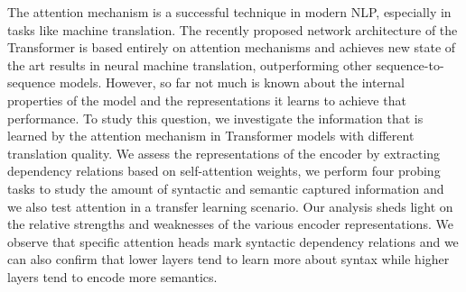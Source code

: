 The attention mechanism is a successful technique in modern NLP, especially in tasks like machine translation. The recently proposed network architecture of the Transformer is based entirely on attention mechanisms and achieves new state of the art results in neural machine translation, outperforming other sequence-to-sequence models. However, so far not much is known about the internal properties of the model and the representations it learns to achieve that performance. To study this question, we investigate the information that is learned by the attention mechanism in Transformer models with different translation quality. We assess the representations of the encoder by extracting dependency relations based on self-attention weights, we perform four probing tasks to study the amount of syntactic and semantic captured information and we also test attention in a transfer learning scenario. Our analysis sheds light on the relative strengths and weaknesses of the various encoder representations. We observe that specific attention heads mark syntactic dependency relations and we can also confirm that lower layers tend to learn more about syntax while higher layers tend to encode more semantics.

